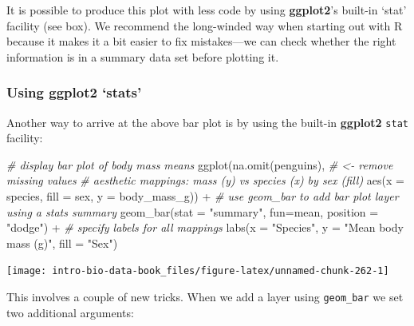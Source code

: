 \documentclass[
]{book}
\newenvironment{Shaded}{\begin{snugshade}}{\end{snugshade}}
\newcommand{\AttributeTok}[1]{\textcolor[rgb]{0.77,0.63,0.00}{#1}}
\newcommand{\CommentTok}[1]{\textcolor[rgb]{0.56,0.35,0.01}{\textit{#1}}}
\newcommand{\FunctionTok}[1]{\textcolor[rgb]{0.00,0.00,0.00}{#1}}
\newcommand{\NormalTok}[1]{#1}
\newcommand{\SpecialCharTok}[1]{\textcolor[rgb]{0.00,0.00,0.00}{#1}}
\newcommand{\StringTok}[1]{\textcolor[rgb]{0.31,0.60,0.02}{#1}}
\newenvironment{greybox}{
  \definecolor{shadecolor}{rgb}{0.95,0.95,0.95}  %
  \color{black}
  \begin{shaded}}
 {\end{shaded}}
\newenvironment{infobox}[1]
  {
  \begin{itemize}
  \renewcommand{\labelitemi}{
    \raisebox{-.7\height}[0pt][0pt]{
      {\setkeys{Gin}{width=3em,keepaspectratio}
        \texttt{[image: images/\#1]}}
    }
  }
  \setlength{\fboxsep}{1em}
  \begin{greybox}
  \item
  }
  {
  \end{greybox}
  \end{itemize}
  }
\begin{document}
It is possible to produce this plot with less code by using \textbf{ggplot2}'s built-in `stat' facility (see box). We recommend the long-winded way when starting out with R because it makes it a bit easier to fix mistakes---we can check whether the right information is in a summary data set before plotting it.

\begin{infobox}{information}

\hypertarget{using-ggplot2-stats}{%
\subsubsection*{\texorpdfstring{Using \textbf{ggplot2} `stats'}{Using ggplot2 `stats'}}\label{using-ggplot2-stats}}

Another way to arrive at the above bar plot is by using the built-in \textbf{ggplot2} \texttt{stat} facility:

\begin{Shaded}
\begin{Highlighting}[]
\CommentTok{\# display bar plot of body mass means}
\FunctionTok{ggplot}\NormalTok{(}\FunctionTok{na.omit}\NormalTok{(penguins), }\CommentTok{\# \textless{}{-} remove missing values}
       \CommentTok{\# aesthetic mappings: mass (y) vs species (x) by sex (fill)}
       \FunctionTok{aes}\NormalTok{(}\AttributeTok{x =}\NormalTok{ species, }\AttributeTok{fill =}\NormalTok{ sex, }\AttributeTok{y =}\NormalTok{ body\_mass\_g)) }\SpecialCharTok{+}
  \CommentTok{\# use geom\_bar to add bar plot layer using a stats summary}
  \FunctionTok{geom\_bar}\NormalTok{(}\AttributeTok{stat =} \StringTok{"summary"}\NormalTok{, }\AttributeTok{fun=}\NormalTok{mean, }\AttributeTok{position =} \StringTok{"dodge"}\NormalTok{) }\SpecialCharTok{+}
  \CommentTok{\# specify labels for all mappings}
  \FunctionTok{labs}\NormalTok{(}\AttributeTok{x =} \StringTok{"Species"}\NormalTok{, }\AttributeTok{y =} \StringTok{"Mean body mass (g)"}\NormalTok{, }\AttributeTok{fill =} \StringTok{"Sex"}\NormalTok{)}
\end{Highlighting}
\end{Shaded}

\begin{center}\texttt{[image: intro-bio-data-book\_files/figure-latex/unnamed-chunk-262-1]} \end{center}

This involves a couple of new tricks. When we add a layer using \texttt{geom\_bar} we set two additional arguments:


\end{infobox}
\end{document}
